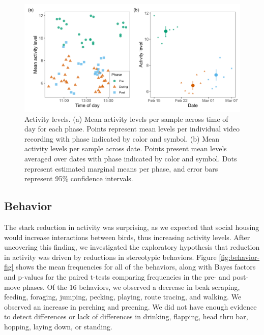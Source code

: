 \documentclass[
  pub]{apa6}
\begin{document}
\begin{figure}

{\centering \includegraphics[width=0.8\linewidth]{figures/activity_time_date} 

}

\caption{Activity levels. (a) Mean activity levels per sample across time of day for each phase. Points represent mean levels per individual video recording with phase indicated by color and symbol. (b) Mean activity levels per sample across date. Points present mean levels averaged over dates with phase indicated by color and symbol. Dots represent estimated marginal means per phase, and error bars represent 95\% confidence intervals.}\label{fig:activity-fig}
\end{figure}

\hypertarget{behavior}{%
\subsection{Behavior}\label{behavior}}

The stark reduction in activity was surprising, as we expected that social housing would increase interactions between birds, thus increasing activity levels. After uncovering this finding, we investigated the exploratory hypothesis that reduction in activity was driven by reductions in stereotypic behaviors. Figure \ref{fig:behavior-fig} shows the mean frequencies for all of the behaviors, along with Bayes factors and p-values for the paired t-tests comparing frequencies in the pre- and post-move phases. Of the 16 behaviors, we observed a decrease in beak scraping, feeding, foraging, jumping, pecking, playing, route tracing, and walking. We observed an increase in perching and preening. We did not have enough evidence to detect differences or lack of differences in drinking, flapping, head thru bar, hopping, laying down, or standing.
\end{document}
